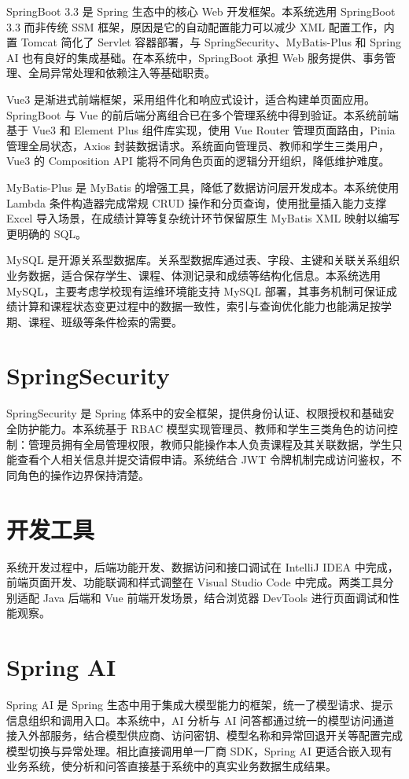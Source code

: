 SpringBoot 3.3 是 Spring 生态中的核心 Web 开发框架\cite{springboot2026reference}。本系统选用 SpringBoot 3.3 而非传统 SSM 框架，原因是它的自动配置能力可以减少 XML 配置工作，内置 Tomcat 简化了 Servlet 容器部署，与 SpringSecurity、MyBatis-Plus 和 Spring AI 也有良好的集成基础\cite{wang2025springbootvue}。在本系统中，SpringBoot 承担 Web 服务提供、事务管理、全局异常处理和依赖注入等基础职责。

Vue3 是渐进式前端框架，采用组件化和响应式设计，适合构建单页面应用\cite{vue2026guide}。SpringBoot 与 Vue 的前后端分离组合已在多个管理系统中得到验证\cite{lai2025filemanage}。本系统前端基于 Vue3 和 Element Plus 组件库实现，使用 Vue Router 管理页面路由，Pinia 管理全局状态，Axios 封装数据请求。系统面向管理员、教师和学生三类用户，Vue3 的 Composition API 能将不同角色页面的逻辑分开组织，降低维护难度。

MyBatis-Plus 是 MyBatis 的增强工具，降低了数据访问层开发成本\cite{mybatisplus2026guide}。本系统使用 Lambda 条件构造器完成常规 CRUD 操作和分页查询，使用批量插入能力支撑 Excel 导入场景，在成绩计算等复杂统计环节保留原生 MyBatis XML 映射以编写更明确的 SQL。

MySQL 是开源关系型数据库\cite{mysql2026reference}。关系型数据库通过表、字段、主键和关联关系组织业务数据，适合保存学生、课程、体测记录和成绩等结构化信息\cite{abraham2024database,wang2023database,zhang2018sql,database2019basic}。本系统选用 MySQL，主要考虑学校现有运维环境能支持 MySQL 部署，其事务机制可保证成绩计算和课程状态变更过程中的数据一致性，索引与查询优化能力也能满足按学期、课程、班级等条件检索的需要。

\section{SpringSecurity}

SpringSecurity 是 Spring 体系中的安全框架，提供身份认证、权限授权和基础安全防护能力\cite{springsecurity2026reference}。本系统基于 RBAC 模型实现管理员、教师和学生三类角色的访问控制：管理员拥有全局管理权限，教师只能操作本人负责课程及其关联数据，学生只能查看个人相关信息并提交请假申请。系统结合 JWT 令牌机制完成访问鉴权，不同角色的操作边界保持清楚。

\section{开发工具}

系统开发过程中，后端功能开发、数据访问和接口调试在 IntelliJ IDEA 中完成，前端页面开发、功能联调和样式调整在 Visual Studio Code 中完成。两类工具分别适配 Java 后端和 Vue 前端开发场景，结合浏览器 DevTools 进行页面调试和性能观察。

\section{Spring AI}

Spring AI 是 Spring 生态中用于集成大模型能力的框架，统一了模型请求、提示信息组织和调用入口\cite{springai2026reference}。本系统中，AI 分析与 AI 问答都通过统一的模型访问通道接入外部服务，结合模型供应商、访问密钥、模型名称和异常回退开关等配置完成模型切换与异常处理。相比直接调用单一厂商 SDK，Spring AI 更适合嵌入现有业务系统，使分析和问答直接基于系统中的真实业务数据生成结果。
